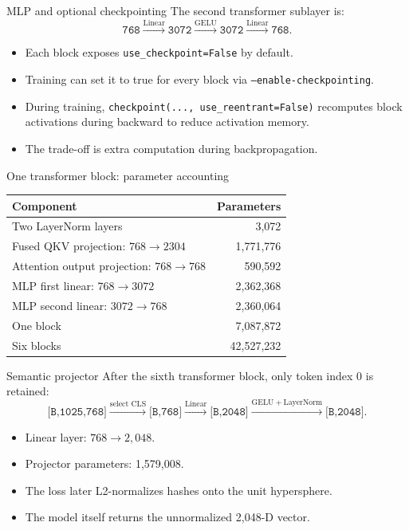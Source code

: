\documentclass[aspectratio=169,10pt]{beamer}
\newcommand{\shape}[1]{\texttt{#1}}
\newcommand{\code}[1]{\texttt{#1}}
\begin{document}
\begin{frame}{MLP and optional checkpointing}
  The second transformer sublayer is:
  \[
    \shape{768}
    \xrightarrow{\mathrm{Linear}}
    \shape{3072}
    \xrightarrow{\mathrm{GELU}}
    \shape{3072}
    \xrightarrow{\mathrm{Linear}}
    \shape{768}.
  \]
  \begin{itemize}
    \item Each block exposes \code{use\_checkpoint=False} by default.
    \item Training can set it to true for every block via
          \code{--enable-checkpointing}.
    \item During training, \code{checkpoint(..., use\_reentrant=False)}
          recomputes block activations during backward to reduce activation memory.
    \item The trade-off is extra computation during backpropagation.
  \end{itemize}
\end{frame}

\begin{frame}{One transformer block: parameter accounting}
  \centering
  \scriptsize
  \begin{tabular}{lr}
    \toprule
    Component & Parameters\\
    \midrule
    Two LayerNorm layers & 3,072\\
    Fused QKV projection: $768\rightarrow2304$ & 1,771,776\\
    Attention output projection: $768\rightarrow768$ & 590,592\\
    MLP first linear: $768\rightarrow3072$ & 2,362,368\\
    MLP second linear: $3072\rightarrow768$ & 2,360,064\\
    \midrule
    One block & 7,087,872\\
    Six blocks & 42,527,232\\
    \bottomrule
  \end{tabular}
\end{frame}

\begin{frame}{Semantic projector}
  After the sixth transformer block, only token index 0 is retained:
  \[
    \shape{[B,1025,768]}
    \xrightarrow{\text{select CLS}}
    \shape{[B,768]}
    \xrightarrow{\mathrm{Linear}}
    \shape{[B,2048]}
    \xrightarrow{\mathrm{GELU + LayerNorm}}
    \shape{[B,2048]}.
  \]
  \begin{itemize}
    \item Linear layer: $768\rightarrow2,048$.
    \item Projector parameters: 1,579,008.
    \item The loss later L2-normalizes hashes onto the unit hypersphere.
    \item The model itself returns the unnormalized 2,048-D vector.
  \end{itemize}
\end{frame}
\end{document}
